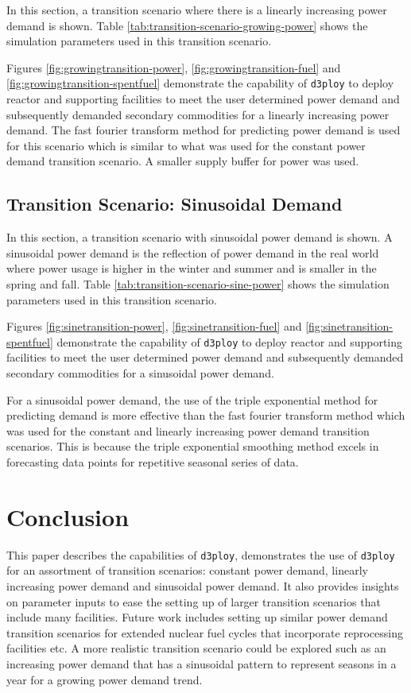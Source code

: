 \documentclass{anstrans}
\newcommand{\deploy}{\texttt{d3ploy}\xspace}%
\begin{document}
In this section, a transition scenario where there is a linearly 
increasing power demand is shown. 
Table \ref{tab:transition-scenario-growing-power} shows the 
simulation parameters used in this transition scenario. 

Figures \ref{fig:growingtransition-power}, \ref{fig:growingtransition-fuel}
and \ref{fig:growingtransition-spentfuel} demonstrate the capability 
of \deploy to deploy reactor and supporting facilities to meet the user 
determined power demand and subsequently demanded secondary commodities 
for a linearly increasing power demand. 
The fast fourier transform method for predicting power demand is used for 
this scenario
which is similar to what was used for the constant power demand 
transition scenario. 
A smaller supply buffer for power was used. 

\subsection{\textbf{Transition Scenario: Sinusoidal Demand}}
In this section, a transition scenario with sinusoidal
power demand is shown. 
A sinusoidal power demand is the reflection of power demand in 
the real world where power usage is higher in the winter and summer
and is smaller in the spring and fall. 
Table \ref{tab:transition-scenario-sine-power} shows the 
simulation parameters used in this transition scenario. 

Figures \ref{fig:sinetransition-power}, \ref{fig:sinetransition-fuel}
and \ref{fig:sinetransition-spentfuel} demonstrate the capability 
of \deploy to deploy reactor and supporting facilities to meet the user 
determined power demand and subsequently demanded secondary commodities 
for a sinusoidal power demand. 

For a sinusoidal power demand, the use of the triple exponential method
for predicting demand is more effective than the 
fast fourier transform method which was used for the constant 
and linearly increasing power demand transition scenarios. 
This is because the triple exponential smoothing method excels in
forecasting data points for repetitive seasonal series of data.  

\section{Conclusion}
This paper describes the capabilities of \deploy, demonstrates 
the use of \deploy for an assortment of transition scenarios: 
constant power demand, linearly increasing power demand and
sinusoidal power demand.  
It also provides insights on parameter inputs to ease the
setting up of larger transition scenarios that include many facilities. 
Future work includes setting up similar power demand transition 
scenarios for extended nuclear fuel cycles that incorporate reprocessing 
facilities etc. 
A more realistic transition scenario could be explored such as an 
increasing power demand that has a sinusoidal pattern to represent 
seasons in a year for a growing power demand trend. 
\end{document}

